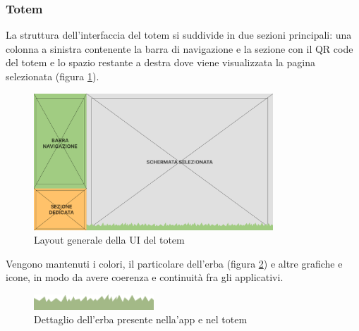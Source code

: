 \subsubsection{Totem}
La struttura dell'interfaccia del totem si suddivide in due sezioni principali: una colonna a sinistra contenente la barra di navigazione e la sezione con il QR code del totem e lo spazio restante a destra dove viene visualizzata la pagina selezionata (figura \ref{fig:viewStruct}).
\begin{figure}[h]
    \centering
    \includegraphics[width=0.8\textwidth]{img/totem/mainStructure.png}
    \caption{Layout generale della UI del totem}
    \label{fig:viewStruct}
\end{figure}

Vengono mantenuti i colori, il particolare dell'erba (figura \ref{fig:grassDetails}) e altre grafiche e icone, in modo da avere coerenza e continuità fra gli applicativi.
\begin{figure}[h]
    \centering
    \includegraphics[width=0.4\textwidth]{img/totem/grassDetail.png}
    \caption{Dettaglio dell'erba presente nella'app e nel totem}
    \label{fig:grassDetails}
\end{figure}

